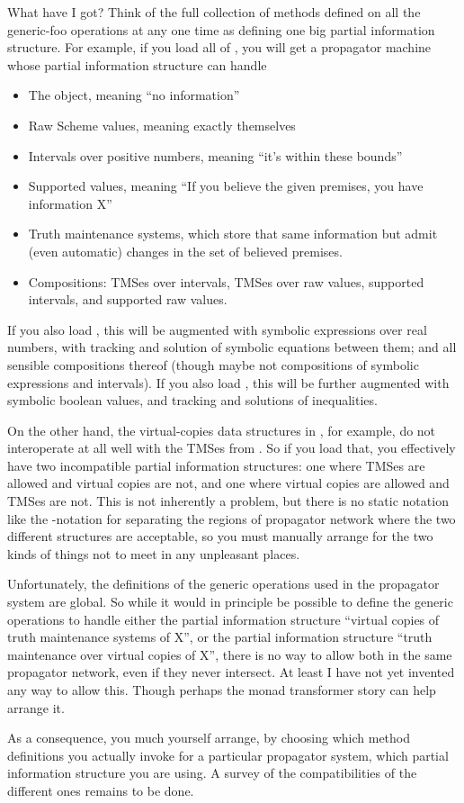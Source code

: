 \documentclass[12pt,letterpaper]{article}
\begin{document}
What have I got?  Think of the full collection of methods defined on
all the generic-foo operations at any one time as defining one big
partial information structure.  For example, if you load all of
, you will get a propagator machine whose partial information
structure can handle
\begin{itemize}
\item The  object, meaning ``no information''
\item Raw Scheme values, meaning exactly themselves
\item Intervals over positive numbers, meaning ``it's within these bounds''
\item Supported values, meaning ``If you believe the given premises, you have information X''
\item Truth maintenance systems, which store that same information but
  admit (even automatic) changes in the set of believed premises.
\item Compositions: TMSes over intervals, TMSes over raw values,
  supported intervals, and supported raw values.
\end{itemize}
If you also load , this will be augmented
with symbolic expressions over real numbers, with tracking and
solution of symbolic equations between them; and all sensible
compositions thereof (though maybe not compositions of symbolic
expressions and intervals).  If you also load
, this will be further augmented with
symbolic boolean values, and tracking and solutions of inequalities.

On the other hand, the virtual-copies data structures in
, for example, do not interoperate at
all well with the TMSes from .  So if you load that, you
effectively have two incompatible partial information structures: one
where TMSes are allowed and virtual copies are not, and one where
virtual copies are allowed and TMSes are not.  This is not inherently
a problem, but there is no static notation like the -notation
for separating the regions of propagator network where the two
different structures are acceptable, so you must manually arrange for
the two kinds of things not to meet in any unpleasant places.

Unfortunately, the definitions of the generic operations used in the
propagator system are global.  So while it would in principle be
possible to define the generic operations to handle either the partial
information structure ``virtual copies of truth maintenance systems of
X'', or the partial information structure ``truth maintenance over
virtual copies of X'', there is no way to allow both in the same
propagator network, even if they never intersect.  At least I have not
yet invented any way to allow this.  Though perhaps the monad
transformer story can help arrange it.

As a consequence, you much yourself arrange, by choosing which method
definitions you actually invoke for a particular propagator system,
which partial information structure you are using.  A survey of the
compatibilities of the different ones remains to be done.
\end{document}
